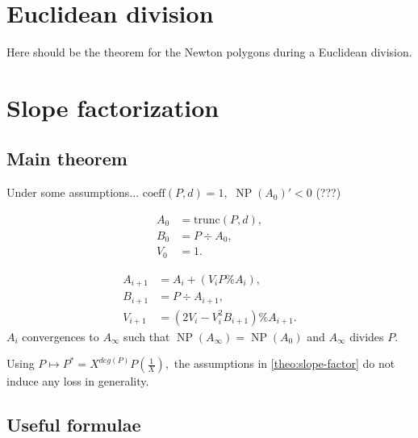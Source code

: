 \documentclass{sig-alternate-2013}
\DeclareMathOperator{\NP}{NP}
\begin{document}
\section{Euclidean division}

\begin{theo} \label{theo:EDivisionNP}
Here should be the theorem for the Newton polygons during a Euclidean division.
\end{theo}

\section{Slope factorization}
\subsection{Main theorem}

\begin{theo} \label{theo:slope-factor}
Under some assumptions... $\textrm{coeff}(P,d)=1,$ $\NP (A_0)' <0$ (???)

\begin{align*}
A_0 &= \textrm{trunc}(P,d), \\
B_{0} &= P \div A_{0}, \\
V_{0} &= 1.
\end{align*}


\begin{align*}
A_{i+1} &= A_i + (V_i P \% A_i), \\
B_{i+1} &= P \div A_{i+1}, \\
V_{i+1} &= (2 V_i -V_i^2 B_{i+1} ) \% A_{i+1}.
\end{align*}
$A_i$ convergences to $A_\infty$ such that $\NP (A_\infty)= \NP (A_0)$ and $A_\infty$ divides $P.$
\end{theo}

\begin{rem}
Using $P \mapsto P^*=X^{deg(P)}P \left( \frac{1}{X} \right), $ the assumptions in \ref{theo:slope-factor} do not induce any loss in generality.
\end{rem}

\subsection{Useful formulae}
\end{document}
